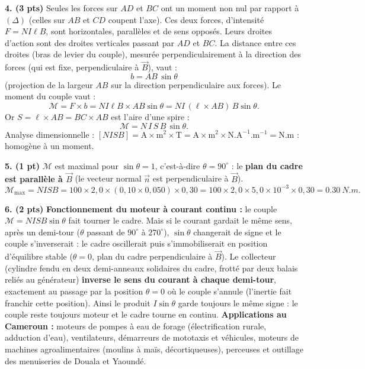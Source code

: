 \documentclass[11pt]{article}
\newcommand{\cle}[1]{{\popxbold\color{popdark}#1}}
\begin{document}
\begin{corrige}
\textbf{4. (3 pts)} Seules les forces sur $AD$ et $BC$ ont un moment non nul par rapport à $(\Delta)$ (celles sur $AB$ et $CD$ coupent l'axe). Ces deux forces, d'intensité $F = NI\ell B$, sont horizontales, parallèles et de sens opposés. Leurs droites d'action sont des droites verticales passant par $AD$ et $BC$. La distance entre ces droites (bras de levier du couple), mesurée perpendiculairement à la direction des forces (qui est fixe, perpendiculaire à $\vec{B}$), vaut :
\[ b = AB\,\sin\theta \]
(projection de la largeur $AB$ sur la direction perpendiculaire aux forces). Le moment du couple vaut :
\[ \mathcal{M} = F\times b = NI\ell B \times AB\sin\theta = NI\,(\ell\times AB)\,B\sin\theta. \]
Or $S = \ell\times AB = BC\times AB$ est l'aire d'une spire :
\[ \boxed{\mathcal{M} = N\,I\,S\,B\,\sin\theta}. \]
Analyse dimensionnelle : $[NISB] = \mathrm{A\times m^2\times T} = \mathrm{A\times m^2\times N.A^{-1}.m^{-1}} = \mathrm{N.m}$ : homogène à un moment. 

\textbf{5. (1 pt)} $\mathcal{M}$ est maximal pour $\sin\theta = 1$, c'est-à-dire $\theta = 90^{\circ}$ : le \textbf{plan du cadre est parallèle à $\vec{B}$} (le vecteur normal $\vec{n}$ est perpendiculaire à $\vec{B}$).
\[ \mathcal{M}_{\max} = NISB = 100\times 2{,}0\times (0{,}10\times 0{,}050)\times 0{,}30 = 100\times 2{,}0\times 5{,}0\times 10^{-3}\times 0{,}30 = \SI{0,30}{N.m}. \]

\textbf{6. (2 pts)} \textbf{Fonctionnement du moteur à courant continu :} le couple $\mathcal{M} = NISB\sin\theta$ fait tourner le cadre. Mais si le courant gardait le même sens, après un demi-tour ($\theta$ passant de $90^{\circ}$ à $270^{\circ}$), $\sin\theta$ changerait de signe et le couple s'inverserait : le cadre oscillerait puis s'immobiliserait en position d'équilibre stable ($\theta = 0$, plan du cadre perpendiculaire à $\vec{B}$).
Le \cle{collecteur} (cylindre fendu en deux demi-anneaux solidaires du cadre, frotté par deux balais reliés au générateur) \textbf{inverse le sens du courant à chaque demi-tour}, exactement au passage par la position $\theta = 0$ où le couple s'annule (l'inertie fait franchir cette position). Ainsi le produit $I\sin\theta$ garde toujours le même signe : le couple reste toujours moteur et le cadre tourne en continu.
\textbf{Applications au Cameroun :} moteurs de pompes à eau de forage (électrification rurale, adduction d'eau), ventilateurs, démarreurs de mototaxis et véhicules, moteurs de machines agroalimentaires (moulins à maïs, décortiqueuses), perceuses et outillage des menuiseries de Douala et Yaoundé.


\end{corrige}
\end{document}
